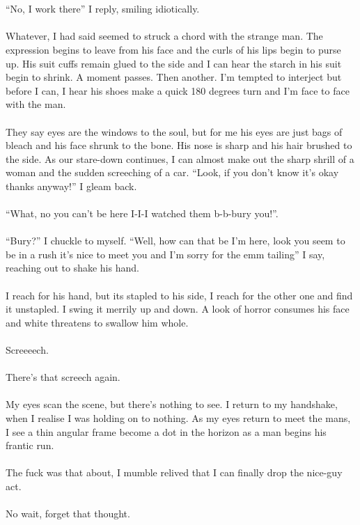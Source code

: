 \documentclass{book}
\begin{document}
{{\\\\``No, I work there'' I reply, smiling idiotically.
\\\\Whatever, I had said seemed to struck a chord with the strange man. The expression begins to leave from his face and the curls of his lips begin to purse up.
His suit cuffs remain glued to the side and I can hear the starch in his suit begin to shrink.
A moment passes.
Then another.
I'm tempted to interject but before I can, I hear his shoes make a quick 180 degrees turn and I'm face to face with the man.
\\\\They say eyes are the windows to the soul, but for me his eyes are just bags of bleach and his face shrunk to the bone. His nose is sharp and his hair brushed to the side. As our stare-down continues, I can almost make out the sharp shrill of a woman and the sudden screeching of a car.
``Look, if you don't know it's okay thanks anyway!'' I gleam back.
\\\\``What, no you can't be here I-I-I watched them b-b-bury you!''.
\\\\``Bury?'' I chuckle to myself. ``Well, how can that be I'm here, look you seem to be in a rush it's nice to meet you and I'm sorry for the emm tailing'' I say, reaching out to shake his hand.
\\\\I reach for his hand, but its stapled to his side, I reach for the other one and find it unstapled. I swing it merrily up and down. A look of horror consumes his face and white threatens to swallow him whole.
\\\\Screeeech.
\\\\There's that screech again.
\\\\My eyes scan the scene, but there's nothing to see. I return to my handshake, when I realise I was holding on to nothing. As my eyes return to meet the mans, I see a thin angular frame become a dot in the horizon as a man begins his frantic run.
\\\\The fuck was that about, I mumble relived that I can finally drop the nice-guy act.
\\\\No wait, forget that thought.
}}
\end{document}
